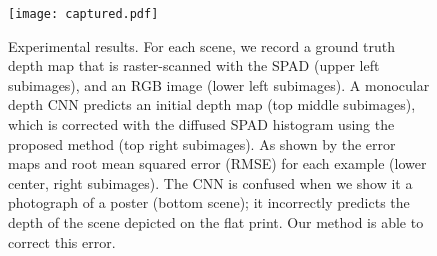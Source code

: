 \begin{figure}[t]
	\centering
	\texttt{[image: captured.pdf]}
	\caption{Experimental results. For each scene, we record a ground truth depth map that is raster-scanned with the SPAD (upper left subimages), and an RGB image (lower left subimages). A monocular depth CNN predicts an initial depth map (top middle subimages), which is corrected with the diffused SPAD histogram using the proposed method (top right subimages). As shown by the error maps and root mean squared error (RMSE) for each example (lower center, right subimages). The CNN is confused when we show it a photograph of a poster (bottom scene); it incorrectly predicts the depth of the scene depicted on the flat print. Our method is able to correct this error. }
	\label{fig:results_captured}
\end{figure}

